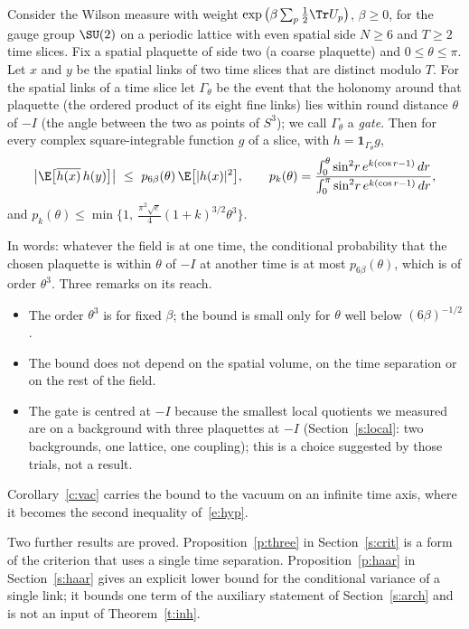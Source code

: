 \begin{theorem}\label{t:ret}
Consider the Wilson measure with weight $\exp\big(\beta\sum_p\tfrac12\Tr U_p\big)$, $\beta\ge0$, for the gauge
group $\SU(2)$ on a periodic lattice with even spatial side $N\ge6$ and $T\ge2$ time slices. Fix a spatial
plaquette of side two (a coarse plaquette) and $0\le\theta\le\pi$. Let $x$ and $y$ be the spatial links of
two time slices that are distinct modulo $T$. For the spatial links of a time slice let $\Gamma_\theta$ be the
event that the holonomy around that plaquette (the ordered product of its eight fine links) lies within round
distance $\theta$ of $-I$ (the angle between the two as points of $S^3$); we call $\Gamma_\theta$ a
\emph{gate}. Then for every complex square-integrable function $g$ of a slice, with
$h=\mathbf 1_{\Gamma_\theta}g$,
\begin{equation}\label{e:ret}
\big|\E\big[\overline{h(x)}\,h(y)\big]\big|\ \le\ p_{6\beta}(\theta)\,\E\big[|h(x)|^2\big],
\qquad
p_k(\theta)=\frac{\int_0^\theta\sin^2\!r\,e^{k(\cos r-1)}\,dr}{\int_0^\pi\sin^2\!r\,e^{k(\cos r-1)}\,dr},
\end{equation}
and $p_k(\theta)\le\min\{1,\ \tfrac{\pi^2\sqrt e}{4}(1+k)^{3/2}\theta^3\}$.
\end{theorem}

In words: whatever the field is at one time, the conditional probability that the chosen plaquette is within
$\theta$ of $-I$ at another time is at most $p_{6\beta}(\theta)$, which is of order $\theta^3$. Three remarks
on its reach.
\begin{itemize}
\item The order $\theta^3$ is for fixed $\beta$; the bound is small only for $\theta$ well below
$(6\beta)^{-1/2}$.
\item The bound does not depend on the spatial volume, on the time separation or on the rest of the field.
\item The gate is centred at $-I$ because the smallest local quotients we measured are on a background with
three plaquettes at $-I$ (Section~\ref{s:local}: two backgrounds, one lattice, one coupling); this is a
choice suggested by those trials, not a result.
\end{itemize}
Corollary~\ref{c:vac} carries the bound to the vacuum on an infinite time axis, where it becomes the second
inequality of~\eqref{e:hyp}.

Two further results are proved. Proposition~\ref{p:three} in Section~\ref{s:crit} is a form of the criterion
that uses a single time separation. Proposition~\ref{p:haar} in Section~\ref{s:haar} gives an explicit lower
bound for the conditional variance of a single link; it bounds one term of the auxiliary statement of
Section~\ref{s:arch} and is not an input of Theorem~\ref{t:inh}.

